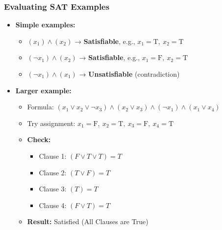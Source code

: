 \begin{frame}
    \frametitle{Evaluating SAT Examples}

    \begin{itemize}
        \item \textbf{Simple examples:}
        \begin{itemize}
            \item $(x_1) \land (x_2)$ → \textbf{Satisfiable}, e.g., $x_1 = \text{T},\ x_2 = \text{T}$
            \item $(\lnot x_1) \land (x_2)$ → \textbf{Satisfiable}, e.g., $x_1 = \text{F},\ x_2 = \text{T}$
            \item $(\lnot x_1) \land (x_1)$ → \textbf{Unsatisfiable} (contradiction)
        \end{itemize}

        \vspace{0.5em}

        \item \textbf{Larger example:}
        \begin{itemize}
            \item Formula: $(x_1 \lor x_2 \lor \lnot x_3) \land (x_2 \lor x_3) \land (\lnot x_1) \land (x_1 \lor x_4)$
            \item Try assignment: $x_1 = \text{F},\ x_2 = \text{T},\ x_3 = \text{F},\ x_4 = \text{T}$
            \item \textbf{Check:} 
            \begin{itemize}
                \item Clause 1: $(F \lor T \lor T) = T$
                \item Clause 2: $(T \lor F) = T$
                \item Clause 3: $(T) = T$
                \item Clause 4: $(F \lor T) = T$
            \end{itemize}
            \item \textbf{Result:} Satisfied (All Clauses are True)
        \end{itemize}
    \end{itemize}
\end{frame}



